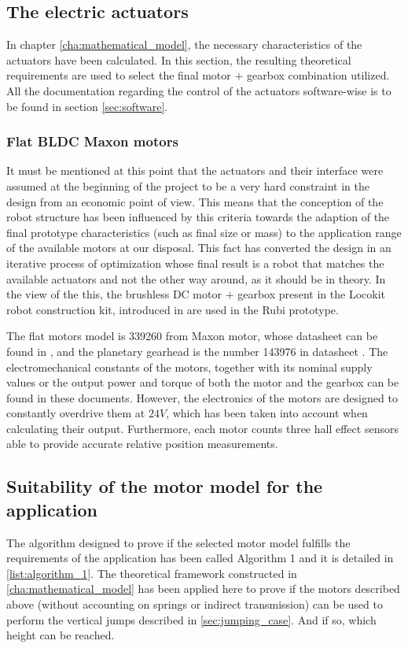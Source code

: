 
\subsection{The electric actuators} %
\label{sub:electric_actuators}
In chapter \ref{cha:mathematical_model}, the necessary characteristics of the actuators have been calculated.
In this section, the resulting theoretical requirements are used to select the final motor $+$ gearbox combination utilized.
All the documentation regarding the control of the actuators software-wise is to be found in section \ref{sec:software}.

\subsubsection{Flat BLDC Maxon motors} %
\label{ssub:the_bldc_motors}
It must be mentioned at this point that the actuators and their interface were assumed at the beginning of the project to be a very hard constraint in the design from an economic point of view. 
This means that the conception of the robot structure has been influenced by this criteria towards the adaption of the final prototype characteristics (such as final size or mass) to the application range of the available motors at our disposal.
This fact has converted the design in an iterative process of optimization whose final result is a robot that matches the available actuators and not the other way around, as it should be in theory.
In the view of the this, the brushless DC motor $+$ gearbox present in the Locokit robot construction kit, introduced in \cite{locokit} are used in the Rubi prototype.

The flat motors model is 339260 from Maxon motor, whose datasheet can be found in \cite{maxon_motor}, and the planetary gearhead is the number 143976 in datasheet \cite{maxon_gear}.
The electromechanical constants of the motors, together with its nominal supply values or the output power and torque of both the motor and the gearbox can be found in these documents. 
However, the electronics of the motors are designed to constantly overdrive them at $24V$, which has been taken into account when calculating their output.
Furthermore, each motor counts three hall effect sensors able to provide accurate relative position measurements.


\subsection{Suitability of the motor model for the application} %
\label{sub:suitability_of_the_motor_model_for_the_application}
The algorithm designed to prove if the selected motor model fulfills the requirements of the application has been called Algorithm 1 and it is detailed in \ref{list:algorithm_1}.
The theoretical framework constructed in \ref{cha:mathematical_model} has been applied here to prove if the motors described above (without accounting on springs or indirect transmission) can be used to perform the vertical jumps described in \ref{sec:jumping_case}.
And if so, which height can be reached.

